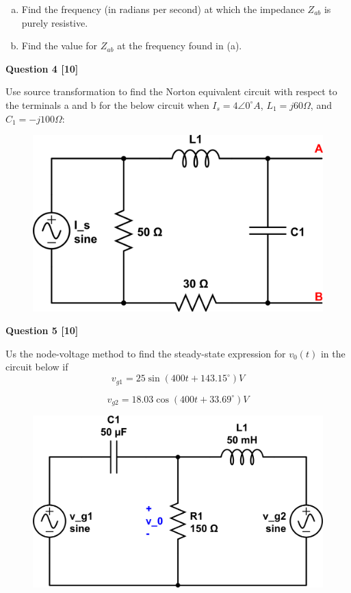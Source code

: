 \documentclass[12pt]{article}
\begin{document}
\begin{enumerate}[(a)]
\item Find the frequency (in radians per second) at which the impedance $Z_{ab}$ is purely resistive.
\item Find the value for $Z_{ab}$ at the frequency found in (a).
\end{enumerate}

\newpage


{\bf Question 4 [10]} %

Use source transformation to find the Norton equivalent circuit with respect to the terminals a and b for the below circuit when $I_s = 4 \angle 0^{\circ} A$, $L_1 = j 60 \Omega$, and $C_1 = -j 100 \Omega$:

\begin{figure}[h!]
\begin{center}
 \includegraphics[scale=0.4]{fig9_44.png}
\end{center}
\end{figure}

{\bf Question 5 [10]} %

Us the node-voltage method to find the steady-state expression for $v_0(t)$ in the circuit below if
\begin{equation}
v_{g1} = 25 \sin{(400t + 143.15^{\circ})} V
\end{equation}

\begin{equation}
v_{g2} = 18.03 \cos{(400t + 33.69^{\circ})} V
\end{equation}



\begin{figure}[h!]
\begin{center}
 \includegraphics[scale=0.4]{fig9_54.png}
\end{center}
\end{figure}
\end{document}
